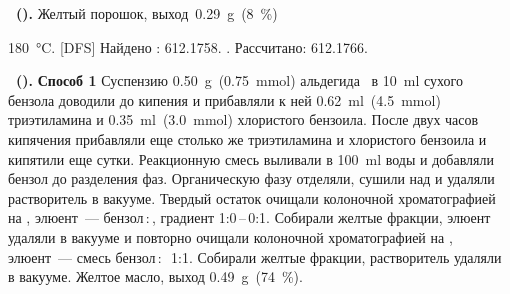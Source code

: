 \textbf{~().}
Желтый порошок, выход~\SI{0.29}{\gram}~(\SI{8}{\percent})
\begin{experimental}[]
     \SI{180}{\celsius}.
    [DFS] Найдено \ce{[M+]}: \num{612.1758}. . Рассчитано:  \num{612.1766}.
\end{experimental}


\textbf{~().} \textbf{Способ 1} Суспензию \SI{0.50}{\gram}~(\SI{0.75}{\mmol}) альдегида~\textbf{} в \SI{10}{\milli\litre} сухого бензола доводили до кипения и прибавляли к ней \SI{0.62}{\milli\litre}~(\SI{4.5}{\mmol}) триэтиламина и \SI{0.35}{\milli\litre}~(\SI{3.0}{\mmol}) хлористого бензоила. После двух часов кипячения прибавляли еще столько же триэтиламина и хлористого бензоила и кипятили еще сутки. Реакционную смесь выливали в \SI{100}{\milli\litre} воды и добавляли бензол до разделения фаз. Органическую фазу отделяли, сушили над  и удаляли растворитель в вакууме. Твердый остаток очищали колоночной хроматографией на , элюент~--- бензол\,:\,, градиент 1:0\,--\,0:1. Собирали желтые фракции, элюент удаляли в вакууме и повторно очищали колоночной хроматографией на , элюент~--- смесь бензол\,:\,~1:1. Собирали желтые фракции, растворитель удаляли в вакууме. Желтое масло, выход \SI{0.49}{\gram}~(\SI{74}{\percent}).

